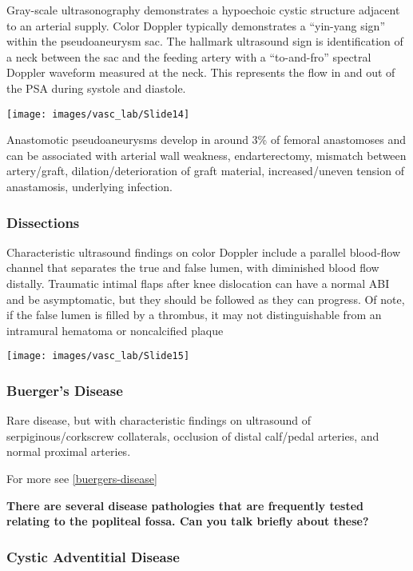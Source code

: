 \documentclass[
]{book}
\begin{document}
Gray-scale ultrasonography demonstrates a hypoechoic cystic structure
adjacent to an arterial supply. Color Doppler typically demonstrates a
``yin-yang sign'' within the pseudoaneurysm sac. The hallmark ultrasound
sign is identification of a neck between the sac and the feeding artery
with a ``to-and-fro'' spectral Doppler waveform measured at the neck. This
represents the flow in and out of the PSA during systole and diastole.

\texttt{[image: images/vasc\_lab/Slide14]}

Anastomotic pseudoaneurysms develop in around 3\% of femoral anastomoses
and can be associated with arterial wall weakness, endarterectomy,
mismatch between artery/graft, dilation/deterioration of graft material,
increased/uneven tension of anastamosis, underlying
infection.\citep{pellerito2019}

\hypertarget{dissections}{%
\subsubsection{Dissections}\label{dissections}}

Characteristic ultrasound findings on color Doppler include a parallel
blood-flow channel that separates the true and false lumen, with
diminished blood flow distally.\citep{ge2015, kobayashi2018} Traumatic
intimal flaps after knee dislocation can have a normal ABI and be
asymptomatic, but they should be followed as they can
progress.\citep{gaitini2008} Of note, if the false lumen is filled by a
thrombus, it may not distinguishable from an intramural hematoma or
noncalcified plaque

\texttt{[image: images/vasc\_lab/Slide15]}

\hypertarget{buerger}{%
\subsubsection{Buerger's Disease}\label{buerger}}

Rare disease, but with characteristic findings on ultrasound of
serpiginous/corkscrew collaterals, occlusion of distal calf/pedal
arteries, and normal proximal arteries.\citep{busch2011, fujii2011}

For more see \ref{buergers-disease}

\textbf{There are several disease pathologies that are frequently tested
relating to the popliteal fossa. Can you talk briefly about these?}

\hypertarget{cad}{%
\subsubsection{\texorpdfstring{\textbf{Cystic Adventitial Disease}}{Cystic Adventitial Disease}}\label{cad}}
\end{document}
